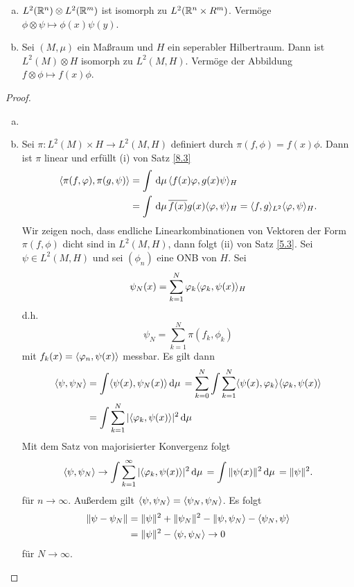 \documentclass{mycourse}
\begin{document}
\begin{kor}\label{8.4}
\begin{enumerate}[a)]
\item $L^2(\R^n)\otimes L^2(\R^m)$ ist isomorph zu $L^2(\R^n \times R^m)$. Vermöge $\phi \otimes \psi \mapsto \phi(x) \psi(y)$.
\item Sei $(M, \mu)$ ein Maßraum und $H$ ein seperabler Hilbertraum. Dann ist $L^2(M) \otimes H$ isomorph zu $L^2(M, H)$. Vermöge der Abbildung $f\otimes \phi \mapsto f(x) \phi$. 
\end{enumerate}
\end{kor}
\begin{proof}
\begin{enumerate}[a)]
\item \fixme
\item Sei $\pi: L^2(M) \times H \to L^2(M, H)$ definiert durch $\pi(f,\phi)= f(x) \phi$. Dann ist $\pi$ linear und erfüllt (i) von Satz \ref{8.3}
\begin{align*}
\< \pi(f, \phi), \pi(g, \psi)\> &= \int \dx[\mu] \< f(x) \phi, g(x) \psi\>_H\\
&= \int \dx[\mu] \overline{f(x)} g(x) \< \phi, \psi\>_H = \< f,g\>_{L^2} \< \phi, \psi \>_H. 
\end{align*}
Wir zeigen noch, dass endliche Linearkombinationen von Vektoren der Form $\pi(f, \phi)$ dicht sind in $L^2(M,H)$, dann folgt (ii) von Satz \ref{5.3}. Sei $\psi \in L^2(M,H)$ und sei $(\phi_n)$ eine ONB von $H$. Sei 
\[
\psi_N(x) = \sum_{k=1}^N \phi_k \< \phi_k, \psi(x)\>_H
\]
d.h. 
\[
\psi_N= \sum_{k=1}^N \pi(f_k, \phi_k)
\]
mit $f_k(x) = \< \phi_n, \psi(x)\>$ messbar. Es gilt dann
\begin{align*}
\< \psi, \psi_N\> &= \int \< \psi(x), \psi_N(x)\> \dx[\mu] = \sum_{k=0}^N \int \sum_{k=1}^N \< \psi(x), \phi_k \> \< \phi_k, \psi(x)\>\\
&=\int \sum_{k=1}^N |\< \phi_k, \psi(x)\>|^2 \dx[\mu]
\end{align*}
Mit dem Satz von majorisierter Konvergenz folgt
\[
\< \psi, \psi_N\> \to \int \sum_{k=1}^\infty |\< \phi_k, \psi(x)\>|^2 \dx[\mu] = \int \| \psi(x)\|^2 \dx[\mu] = \| \psi\|^2.
\]
für $n\to \infty$. Außerdem gilt $\< \psi, \psi_N\> = \< \psi_N, \psi_N\>$. Es folgt
\begin{align*}
\| \psi- \psi_N\|&= \|\psi\|^2 + \| \psi_N\|^2 - \| \psi, \psi_N\> - \< \psi_N, \psi\> \\
&= \|\psi \|^2 - \< \psi, \psi_N\> \to 0 
\end{align*}
für $N\to \infty$.
\end{enumerate}
\end{proof}
\end{document}
